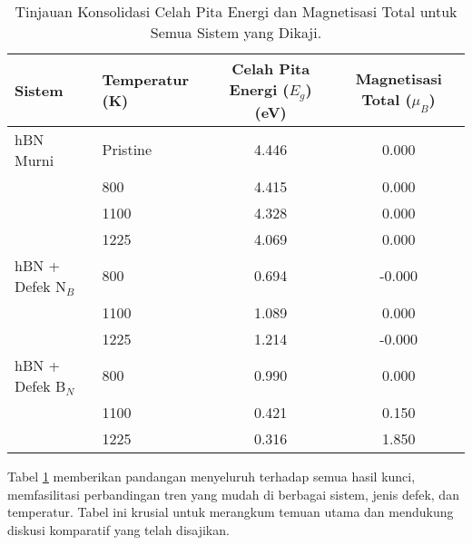 \begin{table}[h!]
  \centering
  \caption{Tinjauan Konsolidasi Celah Pita Energi dan Magnetisasi Total untuk Semua Sistem yang Dikaji.}
  \label{tab:konsolidasi_eg_mag}
  \begin{tabular}{llcc}
    \toprule
    Sistem & Temperatur (K) & Celah Pita Energi ($E_g$) (eV) & Magnetisasi Total ($\mu_B$) \\
    \midrule
    hBN Murni & Pristine & 4.446 & 0.000 \\
              & 800      & 4.415 & 0.000 \\
              & 1100     & 4.328 & 0.000 \\
              & 1225     & 4.069 & 0.000 \\
    \midrule
    hBN + Defek N$_B$ & 800  & 0.694 & -0.000 \\
                      & 1100 & 1.089 &  0.000 \\
                      & 1225 & 1.214 & -0.000 \\
    \midrule
    hBN + Defek B$_N$ & 800  & 0.990 &  0.000 \\
                      & 1100 & 0.421 &  0.150 \\
                      & 1225 & 0.316 &  1.850 \\
    \bottomrule
  \end{tabular}
\end{table}
Tabel \ref{tab:konsolidasi_eg_mag} memberikan pandangan menyeluruh terhadap semua hasil kunci, memfasilitasi perbandingan tren yang mudah di berbagai sistem, jenis defek, dan temperatur. Tabel ini krusial untuk merangkum temuan utama dan mendukung diskusi komparatif yang telah disajikan.



